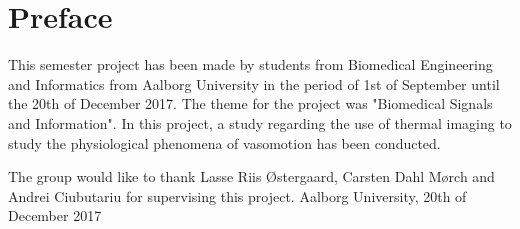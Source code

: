 \chapter*{Preface}

This semester project has been made by students from Biomedical Engineering and Informatics
from Aalborg University in the period of 1st of September until the 20th of December 2017. The theme for the project was "Biomedical Signals and Information". In this project, a
study regarding the use of thermal imaging to study the physiological phenomena of vasomotion has been conducted.

The group would like to thank Lasse Riis Østergaard, Carsten Dahl Mørch and Andrei Ciubutariu for supervising this project.\newline
Aalborg University, 20th of December 2017
\pagebreak